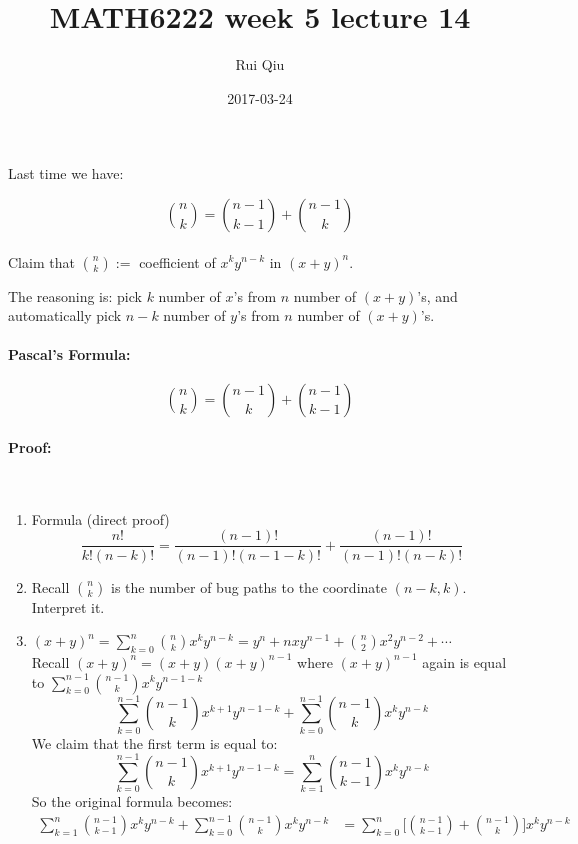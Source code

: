 \documentclass[a4paper, 11pt, twoside]{article}
\begin{document}
\title{MATH6222 week 5 lecture 14}
\author{Rui Qiu}
\date{2017-03-24}

\maketitle

Last time we have:

\[{n \choose k} = {n-1 \choose k-1} + {n-1 \choose k}\]\\

Claim that ${n \choose k} := $ coefficient of $x^ky^{n-k}$ in $(x+y)^n$.

The reasoning is: pick $k$ number of $x$'s from $n$ number of $(x+y)$'s, and automatically pick $n-k$ number of $y$'s from $n$ number of $(x+y)$'s.\\

\paragraph{Pascal's Formula:} \[{n\choose k} = {n-1 \choose k} + {n-1 \choose k-1}\]

\paragraph{Proof:}\ \\

\begin{enumerate}
	\item Formula (direct proof)
	\[\frac{n!}{k!(n-k)!}=\frac{(n-1)!}{(n-1)!(n-1-k)!}+\frac{(n-1)!}{(n-1)!(n-k)!}\]
	\item Recall ${n \choose k}$ is the number of bug paths to the coordinate $(n-k, k)$. Interpret it.
	\item $(x+y)^n = \sum\limits^n_{k=0} {n \choose k} x^ky^{n-k} = y^n + nxy^{n-1} + {n \choose 2}x^2y^{n-2} + \cdots$\\
	Recall $(x+y)^n = (x+y)(x+y)^{n-1}$ where $(x+y)^{n-1}$ again is equal to $\sum\limits^{n-1}_{k=0}{n-1 \choose k}x^ky^{n-1-k}$\\
	\[\sum\limits^{n-1}_{k=0}{n-1 \choose k}x^{k+1}y^{n-1-k}+ \sum\limits^{n-1}_{k=0}{n-1 \choose k}x^ky^{n-k}\]
	We claim that the first term is equal to:
	\[\sum\limits^{n-1}_{k=0}{n-1 \choose k}x^{k+1}y^{n-1-k} = \sum\limits^n_{k=1}{n-1 \choose k-1}x^ky^{n-k}\]
	So the original formula becomes:
	\[
	\begin{split}
		\sum\limits^n_{k=1}{n-1 \choose k-1}x^ky^{n-k} + \sum\limits^{n-1}_{k=0}{n-1 \choose k}x^ky^{n-k} &= \sum\limits^n_{k=0}\bigg[{n-1 \choose k-1} + {n-1 \choose k}\bigg]x^ky^{n-k}\\
	\end{split}
	\]
\end{enumerate}
\end{document}
